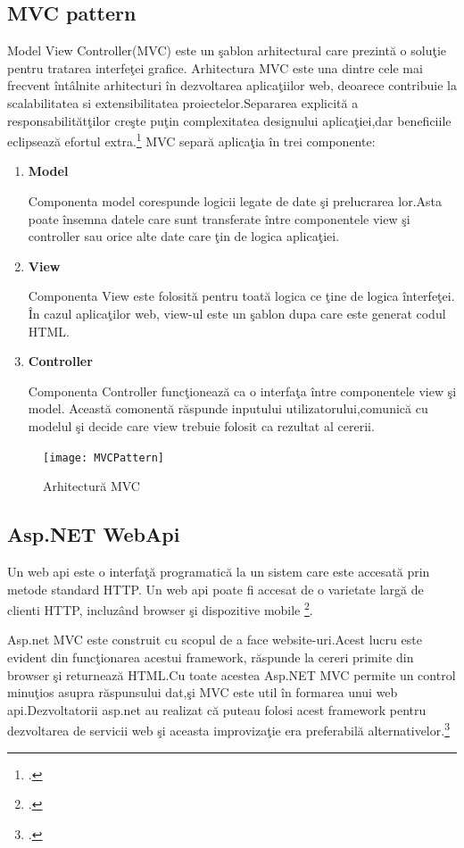 \documentclass[a4paper,12pt]{report}
\begin{document}
\subsection{MVC pattern}
Model View Controller(MVC) este un \c sablon arhitectural care prezint\u a o solu\c tie pentru tratarea interfe\c tei grafice.
Arhitectura MVC este una dintre cele mai frecvent \^int\^alnite arhitecturi \^in dezvoltarea aplica\c tiilor web, deoarece
contribuie la scalabilitatea si extensibilitatea proiectelor.Separarea explicit\u a a responsabilit\u at\c tilor
cre\c ste pu\c tin complexitatea designului aplica\c tiei,dar beneficiile eclipseaz\u a efortul extra.\footcite{proAspNetMVC5Pattern}
MVC separ\u a aplica\c tia \^in trei componente:
\begin{enumerate}
	\item \textbf{Model}

		Componenta model corespunde logicii legate de date \c si prelucrarea lor.Asta poate \^insemna
		datele care sunt transferate \^intre componentele view \c si controller sau orice alte date care \c tin de
		logica aplica\c tiei.
	\item \textbf{View}

		Componenta View este folosit\u a pentru toat\u a logica ce \c tine de logica \^ interfe\c tei.
		\^In cazul aplica\c tilor web, view-ul este un \c sablon dupa care este generat codul HTML.
	\item \textbf{Controller}

		Componenta Controller func\c tioneaz\u a ca o interfa\c ta \^intre componentele view \c si model.
		Aceast\u a comonent\u a r\u aspunde inputului utilizatorului,comunic\u a cu modelul \c si decide 
		care view trebuie folosit ca rezultat al cererii.
\end{enumerate}
\begin{figure}[!htb]
	\texttt{[image: MVCPattern]}
	\caption{Arhitectur\u a MVC}
	\label{fig:MVCPattern}
\end{figure}
\subsection{Asp.NET WebApi}
Un web api este o interfa\c t\u a programatic\u a la un sistem care este accesat\u a prin metode standard HTTP.
Un web api poate fi accesat de o varietate larg\u a de clienti HTTP, incluz\^and browser \c si dispozitive mobile \footcite{evolvableWebApi}.

Asp.net MVC este construit cu scopul de a face website-uri.Acest lucru este evident din func\c tionarea acestui framework,
r\u aspunde la cereri primite din browser \c si returneaz\u a HTML.Cu toate acestea Asp.NET MVC permite un control minu\c tios
asupra r\u aspunsului dat,\c si MVC este util \^in formarea unui web api.Dezvoltatorii asp.net au realizat c\u a puteau folosi
acest framework pentru dezvoltarea de servicii web \c si aceasta improviza\c tie era preferabil\u a alternativelor.\footcite{proAspNetMVC5Asp}
\end{document}
